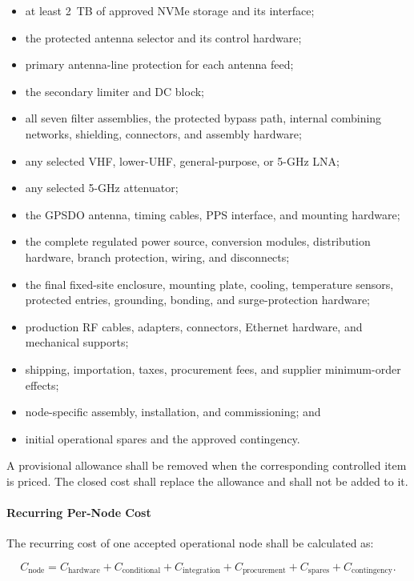 \documentclass[11pt,a4paper]{article}
\begin{document}
	\begin{itemize}[leftmargin=*]
		\item at least 2~TB of approved NVMe storage and its interface;
		\item the protected antenna selector and its control hardware;
		\item primary antenna-line protection for each antenna feed;
		\item the secondary limiter and DC block;
		\item all seven filter assemblies, the protected bypass path, internal
		combining networks, shielding, connectors, and assembly hardware;
		\item any selected VHF, lower-UHF, general-purpose, or 5-GHz LNA;
		\item any selected 5-GHz attenuator;
		\item the GPSDO antenna, timing cables, PPS interface, and mounting
		hardware;
		\item the complete regulated power source, conversion modules,
		distribution hardware, branch protection, wiring, and disconnects;
		\item the final fixed-site enclosure, mounting plate, cooling,
		temperature sensors, protected entries, grounding, bonding, and
		surge-protection hardware;
		\item production RF cables, adapters, connectors, Ethernet hardware, and
		mechanical supports;
		\item shipping, importation, taxes, procurement fees, and supplier
		minimum-order effects;
		\item node-specific assembly, installation, and commissioning; and
		\item initial operational spares and the approved contingency.
	\end{itemize}
	
	A provisional allowance shall be removed when the corresponding controlled
	item is priced. The closed cost shall replace the allowance and shall not be
	added to it.
	
	\paragraph*{Recurring Per-Node Cost}
	
	The recurring cost of one accepted operational node shall be calculated as:
	
	\[
	C_{\mathrm{node}}
	=
	C_{\mathrm{hardware}}
	+
	C_{\mathrm{conditional}}
	+
	C_{\mathrm{integration}}
	+
	C_{\mathrm{procurement}}
	+
	C_{\mathrm{spares}}
	+
	C_{\mathrm{contingency}}.
	\]
	
\end{document}
